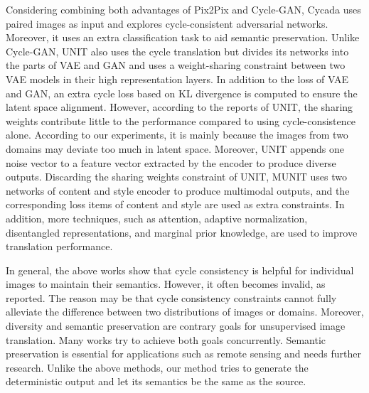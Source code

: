 Considering combining both advantages of Pix2Pix and Cycle-GAN, Cycada\cite{Hoffman:ICML2018} uses paired images as input and explores cycle-consistent adversarial networks. Moreover, it uses an extra classification task to aid semantic preservation. Unlike Cycle-GAN, UNIT\cite{Liu:NIPS2017} also uses the cycle translation but divides its networks into the parts of VAE and GAN and uses a weight-sharing constraint between two VAE models in their high representation layers. In addition to the loss of VAE and GAN, an extra cycle loss based on KL divergence is computed to ensure the latent space alignment. However, according to the reports of UNIT, the sharing weights contribute little to the performance compared to using cycle-consistence alone. According to our experiments, it is mainly because the images from two domains may deviate too much in latent space. Moreover, UNIT appends one noise vector to a feature vector extracted by the encoder to produce diverse outputs. Discarding the sharing weights constraint of UNIT, MUNIT\cite{Huang:ECCV2018} uses two networks of content and style encoder to produce multimodal outputs, and the corresponding loss items of content and style are used as extra constraints. In addition, more techniques, such as attention\cite{Mejjati:NIPS2018}, adaptive normalization\cite{DBLP:Kim2019}, disentangled representations\cite{Lee:DRITplusplus}, and marginal prior knowledge\cite{You:BCCGAN}, are used to improve translation performance.

In general, the above works show that cycle consistency is helpful for individual images to maintain their semantics. However, it often becomes invalid, as \cite{Fu:CVPR2019,Jia:ICCV2021,Yang:CVPR2020,Gong:GAN} reported. The reason may be that cycle consistency constraints cannot fully alleviate the difference between two distributions of images or domains. Moreover, diversity and semantic preservation are contrary goals for unsupervised image translation. Many works\cite{Zhu:ICCV2017,Liu:NIPS2017,Huang:ECCV2018,Mejjati:NIPS2018,DBLP:Kim2019,Lee:DRITplusplus,You:BCCGAN} try to achieve both goals concurrently. Semantic preservation is essential for applications such as remote sensing and needs further research. Unlike the above methods, our method tries to generate the deterministic output and let its semantics be the same as the source.

